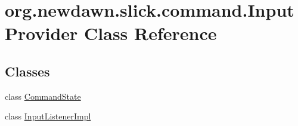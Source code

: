 \hypertarget{classorg_1_1newdawn_1_1slick_1_1command_1_1_input_provider}{}\section{org.\+newdawn.\+slick.\+command.\+Input\+Provider Class Reference}
\label{classorg_1_1newdawn_1_1slick_1_1command_1_1_input_provider}
\subsection*{Classes}
\begin{DoxyCompactItemize}
\item 
class \mbox{\hyperlink{classorg_1_1newdawn_1_1slick_1_1command_1_1_input_provider_1_1_command_state}{Command\+State}}
\item 
class \mbox{\hyperlink{classorg_1_1newdawn_1_1slick_1_1command_1_1_input_provider_1_1_input_listener_impl}{Input\+Listener\+Impl}}
\end{DoxyCompactItemize}
